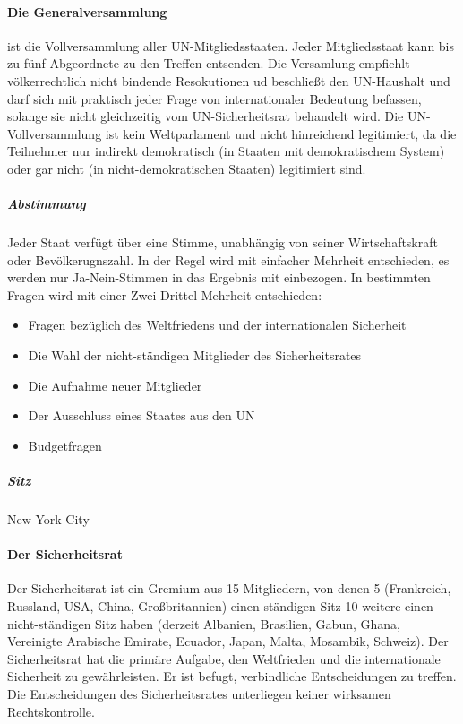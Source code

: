 \documentclass{article}
\begin{document}
	\paragraph{Die Generalversammlung}
	ist die Vollversammlung aller UN-Mitgliedsstaaten. Jeder Mitgliedsstaat kann bis zu fünf Abgeordnete zu den Treffen entsenden. Die Versamlung empfiehlt völkerrechtlich nicht bindende Resokutionen ud beschließt den UN-Haushalt und darf sich mit praktisch jeder Frage von internationaler Bedeutung befassen, solange sie nicht gleichzeitig vom UN-Sicherheitsrat behandelt wird. Die UN-Vollversammlung ist kein Weltparlament und nicht hinreichend legitimiert, da die Teilnehmer nur indirekt demokratisch (in Staaten mit demokratischem System) oder gar nicht (in nicht-demokratischen Staaten) legitimiert sind.


	\subparagraph{Abstimmung}
	Jeder Staat verfügt über eine Stimme, unabhängig von seiner Wirtschaftskraft oder Bevölkerugnszahl. In der Regel wird mit einfacher Mehrheit entschieden, es werden nur Ja-Nein-Stimmen in das Ergebnis mit einbezogen. In bestimmten Fragen wird mit einer Zwei-Drittel-Mehrheit entschieden:

	\begin{itemize}
		\item Fragen bezüglich des Weltfriedens und der internationalen Sicherheit
		\item Die Wahl der nicht-ständigen Mitglieder des Sicherheitsrates
		\item Die Aufnahme neuer Mitglieder
		\item Der Ausschluss eines Staates aus den UN
		\item Budgetfragen
	\end{itemize}

	\subparagraph{Sitz}
	New York City

	\paragraph{Der Sicherheitsrat}
	Der Sicherheitsrat ist ein Gremium aus 15 Mitgliedern, von denen 5 (Frankreich, Russland, USA, China, Großbritannien) einen ständigen Sitz 10 weitere einen nicht-ständigen Sitz haben (derzeit Albanien, Brasilien, Gabun, Ghana, Vereinigte Arabische Emirate, Ecuador, Japan, Malta, Mosambik, Schweiz). Der Sicherheitsrat hat die primäre Aufgabe, den Weltfrieden und die internationale Sicherheit zu gewährleisten. Er ist befugt, verbindliche Entscheidungen zu treffen. Die Entscheidungen des Sicherheitsrates unterliegen keiner wirksamen Rechtskontrolle. 
\end{document}
